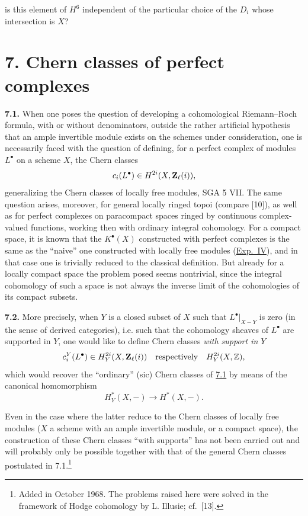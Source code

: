 is this element of $H^6$ independent of the particular choice of the $D_i$
whose intersection is $X$?

\section*{7. Chern classes of perfect complexes}

\noindent{}\textbf{7.1.}
When one poses the question of developing a cohomological Riemann--Roch
formula, with or without denominators, outside the rather artificial
hypothesis that an ample invertible module exists on the schemes under
consideration, one is necessarily faced with the question of defining, for
a perfect complex of modules $L^\bullet$ on a scheme $X$, the Chern classes
\[
 c_i(L^\bullet)\in H^{2i}(X,\mathbf Z_\ell(i)),
\]
generalizing the Chern classes of locally free modules, SGA 5 VII. The same
question arises, moreover, for general locally ringed topoi (compare [10]),
as well as for perfect complexes on paracompact spaces ringed by continuous
complex-valued functions, working then with ordinary integral cohomology.
For a compact space, it is known that the $K^\bullet(X)$ constructed with
perfect complexes is the same as the ``naive'' one constructed with locally
free modules (\hyperlink{sga6.e04.expose}{Exp.~IV}), and in that case one is trivially reduced to the
classical definition. But already for a locally compact space the problem
posed seems nontrivial, since the integral cohomology of such a space is not
always the inverse limit of the cohomologies of its compact subsets.

\noindent{}\textbf{7.2.}
More precisely, when $Y$ is a closed subset of $X$ such that
$L^\bullet|_{X-Y}$ is zero (in the sense of derived categories), i.e. such
that the cohomology sheaves of $L^\bullet$ are supported in $Y$, one would
like to define Chern classes \emph{with support in $Y$}
\[
 c_i^Y(L^\bullet)\in H_Y^{2i}(X,\mathbf Z_\ell(i))
 \quad\text{respectively}\quad H_Y^{2i}(X,\mathbb Z),
\]
which would recover the ``ordinary'' (sic) Chern classes of \hyperlink{sga6.e14.para.7-1}{7.1} by means of
the canonical homomorphism
\[
 H_Y^*(X,-)\longrightarrow H^*(X,-).
\]

Even in the case where the latter reduce to the Chern classes of locally
free modules ($X$ a scheme with an ample invertible module, or a compact
space), the construction of these Chern classes ``with supports'' has not
been carried out and will probably only be possible together with that of
the general Chern classes postulated in 7.1.\footnote{Added in October 1968.
The problems raised here were solved in the framework of Hodge cohomology by
L. Illusie; cf.~[13].}


